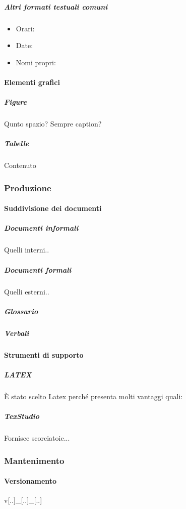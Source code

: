 			\subparagraph{Altri formati testuali comuni} %
			\begin{itemize}
				\item Orari:
				\item Date:
				\item Nomi propri:
			\end{itemize}
		
		
		
			\paragraph{Elementi grafici}
			
			\subparagraph{Figure}
			Qunto spazio? Sempre caption?
			
			\subparagraph{Tabelle}
			Contenuto
			
			
			
		\subsubsection{Produzione}

			\paragraph{Suddivisione dei documenti}
			
			\subparagraph{Documenti informali}
			Quelli interni..
			
			\subparagraph{Documenti formali}
			Quelli esterni..
			
			\subparagraph{Glossario}
			
			\subparagraph{Verbali}
			
			
			
			\paragraph{Strumenti di supporto}
			
			\subparagraph{LATEX}
			È stato scelto Latex perché presenta molti vantaggi quali:
			
			\subparagraph{TexStudio} 
			Fornisce scorciatoie...
			
			
		\subsubsection{Mantenimento}
		
			\paragraph{Versionamento}
			v[..]\_[..]\_[..]	%
			
